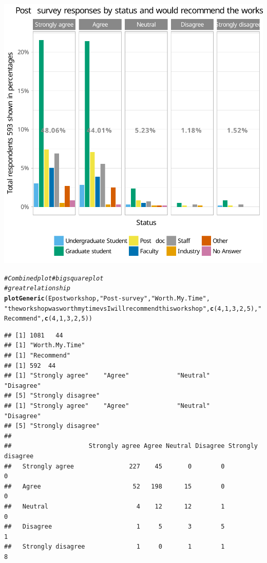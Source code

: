 \documentclass{article}\usepackage[]{graphicx}\usepackage[]{color}
\makeatletter
\newcommand{\hlnum}[1]{\textcolor[rgb]{0.686,0.059,0.569}{#1}}%
\newcommand{\hlstr}[1]{\textcolor[rgb]{0.192,0.494,0.8}{#1}}%
\newcommand{\hlcom}[1]{\textcolor[rgb]{0.678,0.584,0.686}{\textit{#1}}}%
\newcommand{\hlstd}[1]{\textcolor[rgb]{0.345,0.345,0.345}{#1}}%
\newcommand{\hlkwd}[1]{\textcolor[rgb]{0.737,0.353,0.396}{\textbf{#1}}}%
\newenvironment{kframe}{%
 \def\at@end@of@kframe{}%
 \ifinner\ifhmode%
  \def\at@end@of@kframe{\end{minipage}}%
  \begin{minipage}{\columnwidth}%
 \fi\fi%
 \def\FrameCommand##1{\hskip\@totalleftmargin \hskip-\fboxsep
 \colorbox{shadecolor}{##1}\hskip-\fboxsep
     \hskip-\linewidth \hskip-\@totalleftmargin \hskip\columnwidth}%
 \MakeFramed {\advance\hsize-\width
   \@totalleftmargin\z@ \linewidth\hsize
   \@setminipage}}%
 {\par\unskip\endMakeFramed%
 \at@end@of@kframe}
\newenvironment{knitrout}{}{} %
\makeatother
\begin{document}
\begin{knitrout}
{\centering \includegraphics[width=.6\linewidth]{figure/calls-Rnwplotting-postsurvey-data-23} 

}


\begin{kframe}\begin{alltt}
\hlcom{# Combined plot # big square plot}
\hlcom{# great relationship}
\hlkwd{plotGeneric}\hlstd{(Epostworkshop,} \hlstr{"Post-survey"}\hlstd{,} \hlstr{"Worth.My.Time"} \hlstd{,}
            \hlstr{"the workshop was worth my time vs I will recommend this workshop"}\hlstd{,}  \hlkwd{c}\hlstd{(}\hlnum{4}\hlstd{,}\hlnum{1}\hlstd{,}\hlnum{3}\hlstd{,}\hlnum{2}\hlstd{,}\hlnum{5}\hlstd{),}\hlstr{"Recommend"}\hlstd{,} \hlkwd{c}\hlstd{(}\hlnum{4}\hlstd{,}\hlnum{1}\hlstd{,}\hlnum{3}\hlstd{,}\hlnum{2}\hlstd{,}\hlnum{5}\hlstd{))}
\end{alltt}
\begin{verbatim}
## [1] 1081   44
## [1] "Worth.My.Time"
## [1] "Recommend"
## [1] 592  44
## [1] "Strongly agree"    "Agree"             "Neutral"           "Disagree"         
## [5] "Strongly disagree"
## [1] "Strongly agree"    "Agree"             "Neutral"           "Disagree"         
## [5] "Strongly disagree"
##                    
##                     Strongly agree Agree Neutral Disagree Strongly disagree
##   Strongly agree               227    45       0        0                 0
##   Agree                         52   198      15        0                 0
##   Neutral                        4    12      12        1                 0
##   Disagree                       1     5       3        5                 1
##   Strongly disagree              1     0       1        1                 8
\end{verbatim}
\end{kframe}


\end{knitrout}
\end{document}
